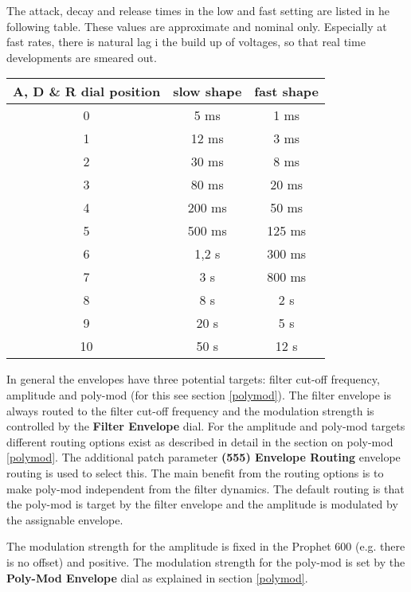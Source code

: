 
The attack, decay and release times in the low and fast setting are listed in he following table. These values are approximate and nominal only. Especially at fast rates, there is natural lag i the build up of voltages, so that real time developments are smeared out.

\begin{center}
  
  \begin{tabular}{ |c|c|c|} 
   \hline
    A, D \& R dial position & slow shape & fast shape \\
   \hline
  0 & 5 ms & 1 ms \\
   \hline
  1 & 12 ms & 3 ms \\
   \hline
  2 & 30 ms & 8 ms \\
   \hline
  3 & 80 ms & 20 ms \\
   \hline
  4 & 200 ms & 50 ms \\
   \hline
  5 & 500 ms & 125 ms \\
   \hline
  6 & 1,2 s & 300 ms \\
   \hline
  7 & 3 s & 800 ms \\
   \hline
  8 & 8 s & 2 s \\
   \hline
  9 & 20 s & 5 s \\
   \hline
  10 & 50 s & 12 s \\
   \hline

  \end{tabular} 
\end{center}

 
In general the envelopes have three potential targets: filter cut-off frequency, amplitude and poly-mod (for this see section \ref{polymod}). The filter envelope is always routed to the filter cut-off frequency and the modulation strength is controlled by the \textbf{Filter Envelope} dial. For the  amplitude and poly-mod targets different routing options exist as described in detail in the section on poly-mod \ref{polymod}. The additional patch parameter \textbf{(555) Envelope Routing} envelope routing is used to select this. The main benefit from the routing options is to make poly-mod independent from the filter dynamics. The default routing is that the poly-mod is target by the filter envelope and the amplitude is modulated by the assignable envelope.

The modulation strength for the amplitude is fixed in the Prophet 600 (e.g. there is no offset) and positive. The modulation strength for the poly-mod is set by the \textbf{Poly-Mod Envelope} dial as explained in section \ref{polymod}. 
